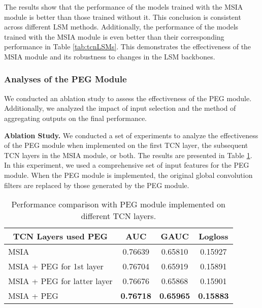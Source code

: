 The results show that the performance of the models trained with the MSIA module is better than those trained without it. This conclusion is consistent across different LSM methods. Additionally, the performance of the models trained with the MSIA module is even better than their corresponding performance in Table \ref{tab:tcnLSMs}. This demonstrates the effectiveness of the MSIA module and its robustness to changes in the LSM backbones. 

\subsubsection{\textbf{Analyses of the PEG Module}} 

We conducted an ablation study to assess the effectiveness of the PEG module. Additionally, we analyzed the impact of input selection and the method of aggregating outputs on the final performance. 

\textbf{Ablation Study.} We conducted a set of experiments to analyze the effectiveness of the PEG module when implemented on the first TCN layer, the subsequent TCN layers in the MSIA module, or both. The results are presented in Table \ref{tab:PEG_layers}. In this experiment, we used a comprehensive set of input features for the PEG module. When the PEG module is implemented, the original global convolution filters are replaced by those generated by the PEG module. 

\begin{table}[t]
    \centering
    \caption{Performance comparison with PEG module implemented on different TCN layers. }
    \begin{tabular}{cccc}
    \toprule
     TCN Layers used PEG & AUC & GAUC & Logloss \\
    \midrule
    \multicolumn{1}{l|}{MSIA} & 0.76639 & 0.65810 & 0.15927 \\
    \midrule
    \multicolumn{1}{l|}{MSIA + PEG for 1st layer} & 0.76704 & 0.65919 & 0.15891 \\
    \midrule
    \multicolumn{1}{l|}{MSIA + PEG for latter layer} & 0.76676 & 0.65868 & 0.15901 \\
    \midrule
    \multicolumn{1}{l|}{MSIA + PEG} & \textbf{0.76718} & \textbf{0.65965} & \textbf{0.15883} \\
    \bottomrule
    \end{tabular}
\label{tab:PEG_layers}
\vspace{-0.5cm}
\end{table}

